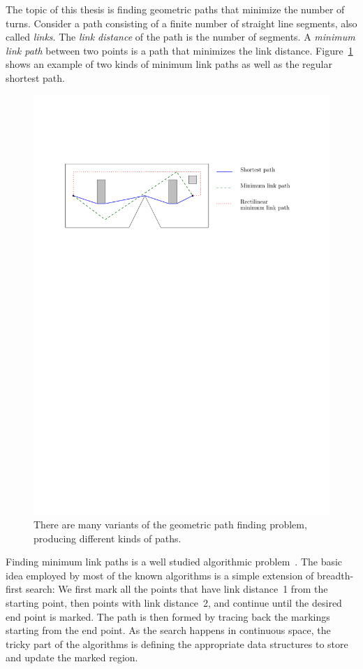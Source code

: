 \documentclass[english,gradu]{tktltiki2018}
\begin{document}
The topic of this thesis is finding geometric paths that minimize the number of turns.
Consider a path consisting of a finite number of straight line segments, also called \emph{links}.
The \emph{link distance} of the path is the number of segments.
A \emph{minimum link path} between two points is a path that minimizes the link distance.
Figure~\ref{fig:paths} shows an example of two kinds of minimum link paths as well as the regular shortest path.

\begin{figure}\centering
	\includegraphics[width=\textwidth]{fig/paths}
	\caption{There are many variants of the geometric path finding problem, producing different kinds of paths.}\label{fig:paths}
\end{figure}

Finding minimum link paths is a well studied algorithmic problem~\cite{dasnar,de1991,de1992,fitch,handbook,restricted,wagner}.
The basic idea employed by most of the known algorithms is a simple extension of breadth-first search:
We first mark all the points that have link distance~1 from the starting point, then points with link distance~2, and continue until the desired end point is marked.
The path is then formed by tracing back the markings starting from the end point.
As the search happens in continuous space, the tricky part of the algorithms is defining the appropriate data structures to store and update the marked region.
\end{document}
